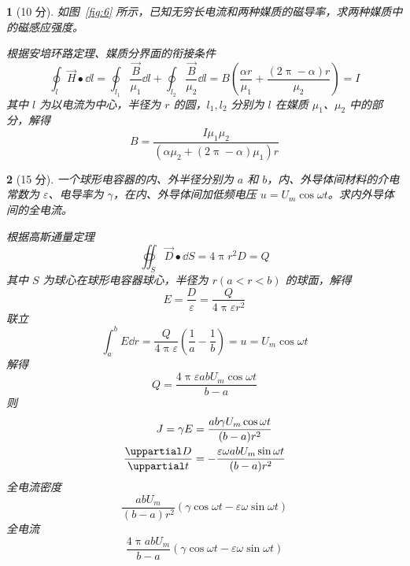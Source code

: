 \documentclass{book}
\theoremstyle{change}
\newtheorem{ti}{}[section]
\def\partial{\uppartial}
\begin{document}
\begin{ti}[10 分]
	如图~\ref{fig:6} 所示，已知无穷长电流和两种媒质的磁导率，求两种媒质中的磁感应强度。
	\begin{solution}
		根据安培环路定理、媒质分界面的衔接条件
		\[
			\oint_l\vec{H}\bullet\dd l=\oint_{l_1}\frac{\vec{B}}{\mu_1}\dd l+\oint_{l_2}\frac{\vec{B}}{\mu_2}\dd l=B\left(\frac{\alpha r}{\mu_1}+\frac{(2\uppi-\alpha)r}{\mu_2}\right)=I
		\]
		其中 $l$ 为以电流为中心，半径为 $r$ 的圆，$l_1,l_2$ 分别为 $l$ 在媒质 $\mu_1$、$\mu_2$ 中的部分，解得
		\[
			B=\frac{I\mu_1\mu_2}{(\alpha\mu_2+(2\uppi-\alpha)\mu_1)r}
		\]
	\end{solution}
\end{ti}

\begin{ti}[15 分]
	一个球形电容器的内、外半径分别为 $a$ 和 $b$，内、外导体间材料的介电常数为 $\varepsilon$、电导率为 $\gamma$，在内、外导体间加低频电压 $u=U_m\cos\omega t$。求内外导体间的全电流。
	\begin{solution}
		根据高斯通量定理
		\[
			\oiint_{S}\vec{D}\bullet\dd S=4\uppi r^2D=Q
		\]
		其中 $S$ 为球心在球形电容器球心，半径为 $r(a<r<b)$ 的球面，解得
		\[
			E=\frac{D}{\varepsilon}=\frac{Q}{4\uppi\varepsilon r^2}
		\]
		联立
		\[
			\int_{a}^{b}E\dd r=\frac{Q}{4\uppi\varepsilon}\left(\frac{1}{a}-\frac{1}{b}\right)=u=U_m\cos\omega t
		\]
		解得
		\[
			Q=\frac{4\uppi\varepsilon abU_m\cos\omega t}{b-a}
		\]
		则
		\begin{align*}
			J=\gamma E&=\frac{ab\gamma U_m\cos\omega t}{(b-a)r^2}\\
			\frac{\partial D}{\partial t}&=-\frac{\varepsilon\omega abU_m\sin\omega t}{(b-a)r^2}
		\end{align*}
		全电流密度
		\[
			\frac{abU_m}{(b-a)r^2}\left(\gamma\cos\omega t-\varepsilon\omega\sin\omega t\right)
		\]
		全电流
		\[
			\frac{4\uppi abU_m}{b-a}(\gamma\cos\omega t-\varepsilon\omega\sin\omega t)
		\]
	\end{solution}
\end{ti}



\end{document}
